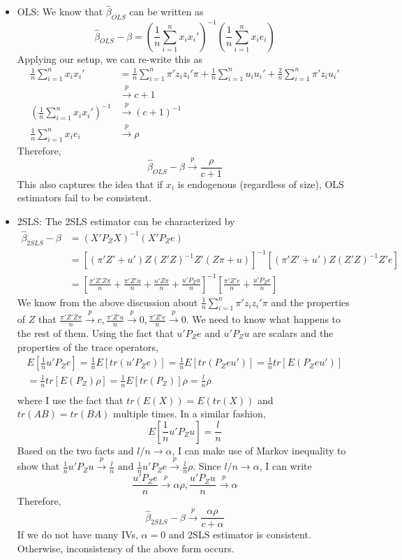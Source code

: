 \documentclass[12pt]{article}
\theoremstyle{definition}
\theoremstyle{property}
\theoremstyle{assumption}
\theoremstyle{example}
\theoremstyle{comment}
\begin{document}
\begin{itemize}
\item OLS: We know that $\hat{\beta}_{OLS}$ can be written as
\[
\hat{\beta}_{OLS}-\beta=\left(\frac{1}{n}\sum_{i=1}^n x_ix_i'\right)^{-1}\left(\frac{1}{n}\sum_{i=1}^n x_ie_i\right)
\]
Applying our setup, we can re-write this as
\[
\begin{aligned}
\frac{1}{n}\sum_{i=1}^n x_ix_i'&=\frac{1}{n}\sum_{i=1}^n \pi'z_iz_i'\pi+\frac{1}{n}\sum_{i=1}^n u_iu_i'+\frac{2}{n}\sum_{i=1}^n \pi'z_iu_i'\\
&\xrightarrow{p} c+1\\
\left(\frac{1}{n}\sum_{i=1}^n x_ix_i'\right)^{-1}&\xrightarrow{p} (c+1)^{-1}\\
\frac{1}{n}\sum_{i=1}^n x_ie_i&\xrightarrow{p}\rho
\end{aligned}
\]
Therefore, 
\[
\hat{\beta}_{OLS}-\beta\xrightarrow{p}\frac{\rho}{c+1}
\]
This also captures the idea that if $x_i$ is endogenous (regardless of size), OLS estimators fail to be consistent. 
\par
\item 2SLS: The 2SLS estimator can be characterized by
\[
\begin{aligned}
\hat{\beta}_{2SLS}-\beta&=(X'P_ZX)^{-1}(X'P_Ze)\\
&=[(\pi'Z'+u')Z(Z'Z)^{-1}Z'(Z\pi+u)]^{-1}[(\pi'Z'+u')Z(Z'Z)^{-1}Z'e]\\
&=\left[\frac{\pi'Z'Z\pi}{n}+\frac{\pi'Z'u}{n}+\frac{u'Z\pi}{n}+\frac{u'P_Zu}{n}\right]^{-1}\left[\frac{\pi'Z'e}{n}+\frac{u'P_Ze}{n}\right]
\end{aligned}
\]
We know from the above discussion about $\frac{1}{n}\sum_{i=1}^n \pi'z_iz_i'\pi$ and the properties of $Z$ that  $\frac{\pi'Z'Z\pi}{n}\xrightarrow{p}c, \frac{\pi'Z'u}{n}\xrightarrow{p}0, \frac{\pi'Z'e}{n}\xrightarrow{p}0$. We need to know what happens to the rest of them. Using the fact that $u'P_Ze \text{ and }u'P_Zu$ are scalars and the properties of the trace operators, 
\begin{gather*}
E\left[\frac{1}{n}u'P_Ze\right]=\frac{1}{n}E[tr(u'P_Ze)]=\frac{1}{n}E[tr(P_Zeu')]=\frac{1}{n}tr[E(P_Zeu')]\\
=\frac{1}{n}tr[E(P_Z)\rho]=\frac{1}{n}E[tr(P_Z)]\rho=\frac{l}{n}\rho\\
\end{gather*}
where I use the fact that $tr(E(X))=E(tr(X))$ and $tr(AB)=tr(BA)$ multiple times. In a similar fashion, 
\[
E\left[\frac{1}{n}u'P_Zu\right] = \frac{l}{n}
\]
Based on the two facts and $l/n\to\alpha$, I can make use of Markov inequality to show that $\frac{1}{n}u'P_Zu\xrightarrow{p} \frac{l}{n}\text{ and }\frac{1}{n}u'P_Ze\xrightarrow{p}\frac{l}{n}\rho$. Since $l/n\to\alpha$, I can write
\[
\frac{u'P_Ze}{n}\xrightarrow{p} \alpha\rho, \frac{u'P_Zu}{n}\xrightarrow{p} \alpha
\]
Therefore, 
\[
\hat{\beta}_{2SLS}-\beta\xrightarrow{p}\frac{\alpha\rho}{c+\alpha}
\]
If we do not have many IVs, $\alpha=0$ and 2SLS estimator is consistent. Otherwise, inconsistency of the above form occurs. 
\end{itemize}
\end{document}
